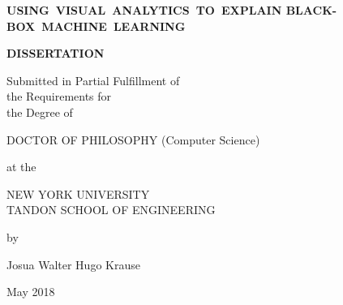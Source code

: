 \documentclass[12pt,draft,letterpaper]{report}
\newcommand{\thesistitle}{USING~VISUAL~ANALYTICS~TO~EXPLAIN
BLACK-BOX~MACHINE~LEARNING}
\newcommand{\thesisauthor}{Josua Walter Hugo Krause}
\newcommand{\graddate}{May 2018} %
\begin{document}

\thispagestyle{empty}
\begin{center}
{\bfseries 
  {\large\thesistitle}
  \vspace{1in}
  
 {\large {\bf DISSERTATION}}\\
  \vspace{.5in}
  
  \begin{doublespace}
  {\large  
  Submitted in Partial Fulfillment of\\
  the Requirements for\\
  the Degree of\\}
  \end{doublespace}
  \vspace{.5in}
  
  {\large DOCTOR OF PHILOSOPHY (Computer Science)}\\
  \vspace{.5in}
  
  at the \\
  \vspace{.2in}
  
  {\large
  NEW YORK UNIVERSITY\\
  \vspace{-0.05in}
  TANDON SCHOOL OF ENGINEERING\\
  }
  \vspace{.2in}
  
  by
  \vspace{.5in}

  {\large\thesisauthor}
  \vspace{.5in}

  {\large\graddate}
}

\end{center}

\newpage
\end{document}
